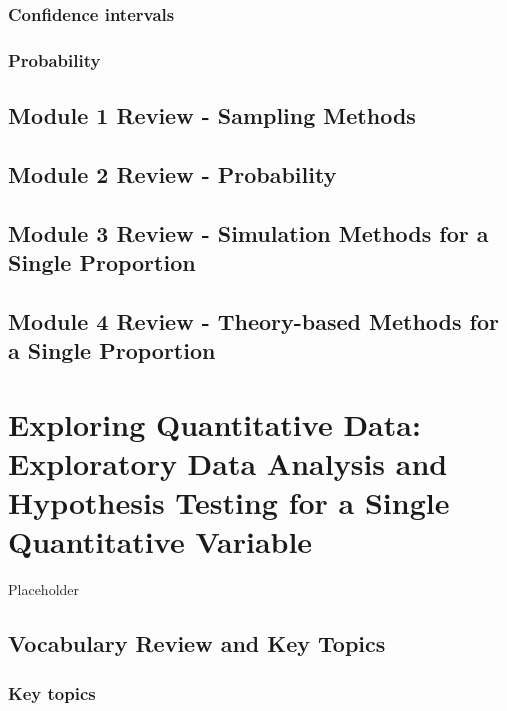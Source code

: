 \documentclass[
]{report}
\begin{document}
\subsection{Confidence intervals}\label{confidence-intervals}

\subsection{Probability}\label{probability-3}

\section{Module 1 Review - Sampling Methods}\label{module-1-review---sampling-methods}

\section{Module 2 Review - Probability}\label{module-2-review---probability}

\section{Module 3 Review - Simulation Methods for a Single Proportion}\label{module-3-review---simulation-methods-for-a-single-proportion}

\section{Module 4 Review - Theory-based Methods for a Single Proportion}\label{module-4-review---theory-based-methods-for-a-single-proportion}

\chapter{Exploring Quantitative Data: Exploratory Data Analysis and Hypothesis Testing for a Single Quantitative Variable}\label{exploring-quantitative-data-exploratory-data-analysis-and-hypothesis-testing-for-a-single-quantitative-variable}

Placeholder

\section{Vocabulary Review and Key Topics}\label{vocabulary-review-and-key-topics-4}

\subsection{Key topics}\label{key-topics-5}
\end{document}
